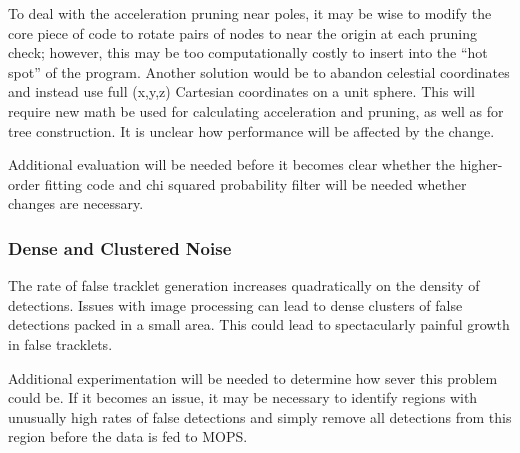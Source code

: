 To deal with the acceleration pruning near poles, it may be wise to
modify the core piece of code to rotate pairs of nodes to near the
origin at each pruning check; however, this may be too computationally
costly to insert into the ``hot spot'' of the program.  Another
solution would be to abandon celestial coordinates and instead use
full (x,y,z) Cartesian coordinates on a unit sphere.  This will
require new math be used for calculating acceleration and pruning, as
well as for tree construction.  It is unclear how performance will be
affected by the change.

Additional evaluation will be needed before it becomes clear whether
the higher-order fitting code and chi squared probability filter will
be needed whether changes are necessary. 



\subsubsection{Dense and Clustered Noise}

The rate of false tracklet generation increases quadratically on the
density of detections. Issues with image processing can lead to dense
clusters of false detections packed in a small area.  This could lead
to spectacularly painful growth in false tracklets.  

Additional experimentation will be needed to determine how sever this
problem could be.  If it becomes an issue, it may be necessary to
identify regions with unusually high rates of false detections and
simply remove all detections from this region before the data is fed
to MOPS.


